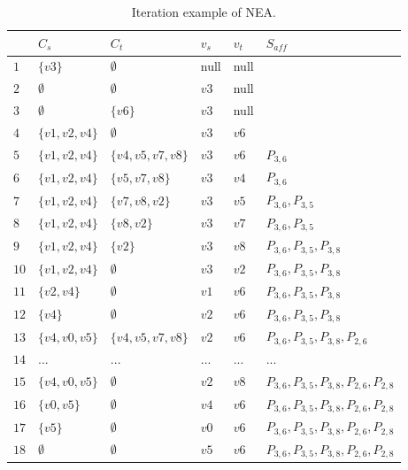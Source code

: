 \begin{table}[htbp]
	\centering
	\caption{Iteration example of NEA.}
	\begin{tabular}{|l|l|l|l|l|l|}
    \hline
     & $C_s$ & $C_t$ & $v_s$ & $v_t$ & $S_\textit{aff}$ \\
    \hline
    $1$ & $\{v3\}$ 		  & $\emptyset$ 	  & null & null &  \\
    $2$ & $\emptyset$	  & $\emptyset$       & $v3$ & null &  \\
    $3$ & $\emptyset$  & $\{v6\}$          & $v3$ & null &  \\
	$4$ & $\{v1,v2,v4\}$  & $\emptyset$ 	  & $v3$ & $v6$ &  \\
    $5$ & $\{v1,v2,v4\}$  & $\{v4,v5,v7,v8\}$ & $v3$ & $v6$ & $P_{3,6}$ \\
    $6$ & $\{v1,v2,v4\}$  & $\{v5,v7,v8\}$    & $v3$ & $v4$ & $P_{3,6}$ \\
    $7$ & $\{v1,v2,v4\}$  & $\{v7,v8,v2\}$ 	  & $v3$ & $v5$ & $P_{3,6},P_{3,5}$ \\
    $8$ & $\{v1,v2,v4\}$  & $\{v8,v2\}$ 	  & $v3$ & $v7$ & $P_{3,6},P_{3,5}$ \\
    $9$ & $\{v1,v2,v4\}$ & $\{v2\}$ 		  & $v3$ & $v8$ & $P_{3,6},P_{3,5},P_{3,8}$ \\
    $10$ & $\{v1,v2,v4\}$ & $\emptyset$ 	  & $v3$ & $v2$ & $P_{3,6},P_{3,5},P_{3,8}$ \\
    $11$ & $\{v2,v4\}$ 	  & $\emptyset$ 	  & $v1$ & $v6$ & $P_{3,6},P_{3,5},P_{3,8}$ \\
    $12$ & $\{v4\}$		  & $\emptyset$ 	  & $v2$ & $v6$ & $P_{3,6},P_{3,5},P_{3,8}$ \\
    $13$ & $\{v4,v0,v5\}$		  & $\{v4,v5,v7,v8\}$ & $v2$ & $v6$ & $P_{3,6},P_{3,5},P_{3,8},P_{2,6}$ \\
    $14$ & $...$		  & $...$ 	  &... & ... & ... \\
    $15$ & $\{v4,v0,v5\}$    & $\emptyset$ 	  & $v2$ & $v8$ & $P_{3,6},P_{3,5},P_{3,8},P_{2,6},P_{2,8}$ \\
    $16$ & $\{v0,v5\}$ 	  & $\emptyset$ 	  & $v4$ & $v6$ & $P_{3,6},P_{3,5},P_{3,8},P_{2,6},P_{2,8}$  \\
    $17$ & $\{v5\}$ 	  & $\emptyset$ 	  & $v0$ & $v6$ & $P_{3,6},P_{3,5},P_{3,8},P_{2,6},P_{2,8}$  \\
    $18$ & $\emptyset$ 	  & $\emptyset$ 	  & $v5$ & $v6$ & $P_{3,6},P_{3,5},P_{3,8},P_{2,6},P_{2,8}$  \\
    \hline
    \end{tabular}
    \label{tab:algo1}
\end{table}

